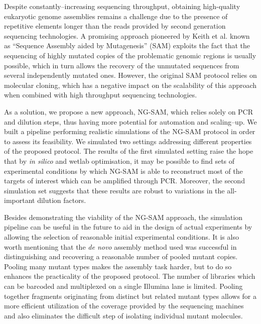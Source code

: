 \documentclass[10pt]{article}
\newcommand{\blue}[1]{{\color{blue} #1}}
\begin{document}
Despite constantly--increasing sequencing throughput, obtaining high-quality eukaryotic genome assemblies remains a challenge due to the presence 
of repetitive elements longer than the reads provided by second generation sequencing technologies.
A promising approach pioneered by Keith et al. \cite{Keith2004,Keith2004a} known as ``Sequence Assembly aided by Mutagenesis'' (SAM) exploits the fact that the sequencing of highly mutated copies of the problematic genomic regions is usually possible, which in turn allows the recovery of the unmutated sequences from several \blue{independently} mutated ones.
However, the original SAM protocol relies on molecular cloning, which has a negative impact on the scalability of this approach when combined with high throughput sequencing technologies. 

As a solution, we propose a new approach, NG-SAM, which relies solely on PCR and dilution steps, thus having more potential for automation and \blue{scaling--up}.
We built a pipeline performing realistic simulations of the NG-SAM protocol in order to assess its feasibility.
We simulated two settings addressing different properties of the proposed protocol. The results of the first simulated setting raise the hope that by {\it in silico} and wetlab optimisation, it may be possible to find sets of experimental conditions by which NG-SAM is able to reconstruct most of the targets of interest which can be amplified through PCR.
Moreover, the second simulation set suggests that these results are robust to variations in the all-important dilution factors.

Besides demonstrating the viability of the NG-SAM approach, the simulation pipeline can be useful in the future to aid in the design of actual experiments by allowing the selection of reasonable initial experimental conditions.
It is also worth mentioning that the {\it de novo} assembly method used was successful in distinguishing and recovering a reasonable number of pooled mutant copies. 
Pooling many mutant types makes the assembly task harder, but to do so enhances the practicality of the proposed protocol. The number of libraries which can be barcoded and multiplexed on a single Illumina lane is limited. Pooling together fragments originating from distinct but related mutant types allows for a more efficient utilization of the coverage provided by the sequencing machines and also eliminates the difficult step of isolating individual mutant molecules.
\end{document}
